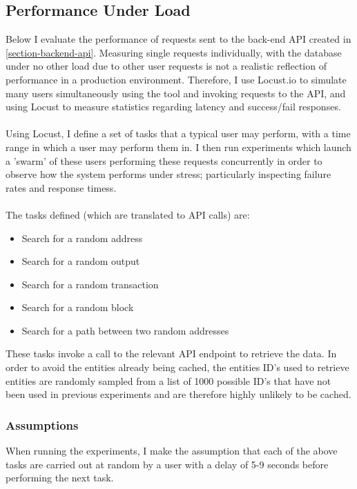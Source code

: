\subsection{Performance Under Load}
Below I evaluate the performance of requests sent to the back-end API created in \ref{section-backend-api}. Measuring single requests individually, with the database under no other load due to other user requests is not a realistic reflection of performance in a production environment. Therefore, I use Locust.io to simulate many users simultaneously using the tool and invoking requests to the API, and using Locust to measure statistics regarding latency and success/fail responses. 
\\\\
Using Locust, I define a set of tasks that a typical user may perform, with a time range in which a user may perform them in. I then run experiments which launch a 'swarm' of these users performing these requests concurrently in order to observe how the system performs under stress; particularly inspecting failure rates and response timess.
\\\\
The tasks defined (which are translated to API calls) are:
\begin{itemize}
    \item Search for a random address
    \item Search for a random output
    \item Search for a random transaction 
    \item Search for a random block
    \item Search for a path between two random addresses
\end{itemize}
These tasks invoke a call to the relevant API endpoint to retrieve the data. In order to avoid the entities already being cached, the entities ID's used to retrieve entities are randomly sampled  from a list of 1000 possible ID's that have not been used in previous experiments and are therefore highly unlikely to be cached. 

\subsubsection{Assumptions}
When running the experiments, I make the assumption that each of the above tasks are carried out at random by a user with a delay of 5-9 seconds before performing the next task. 

